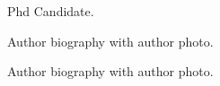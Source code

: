 \documentclass[a4paper,fleqn]{cas-dc}
\begin{document}
%
%






Phd Candidate.
\endbio

\bio{}
Author biography with author photo.
\endbio

\bio{}
Author biography with author photo.
\endbio
\end{document}
